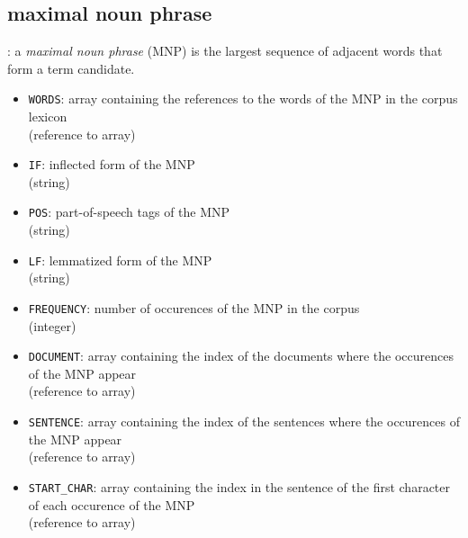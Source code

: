 \subsection{maximal noun phrase}
\begin{definition}
: a \emph{maximal noun phrase} (MNP) is the largest sequence of adjacent words that form a term candidate.  
\end{definition}

\begin{itemize}
\item \texttt{WORDS}: array containing the references to the words of the MNP in the corpus lexicon\\ (reference to array)
\item \texttt{IF}: inflected form of the MNP\\(string)
\item \texttt{POS}: part-of-speech tags of the MNP\\(string)
\item \texttt{LF}: lemmatized form of the MNP\\(string)
\item \texttt{FREQUENCY}: number of occurences of the MNP in the corpus\\ (integer)
\item \texttt{DOCUMENT}: array containing the index of the documents where the occurences of the MNP appear\\ (reference to array)
\item \texttt{SENTENCE}: array containing the index of the sentences where the occurences of the MNP appear\\ (reference to array)
\item \texttt{START\_CHAR}: array containing the index in the sentence
  of the first character of each occurence of the MNP \\ (reference to array)
\end{itemize}

